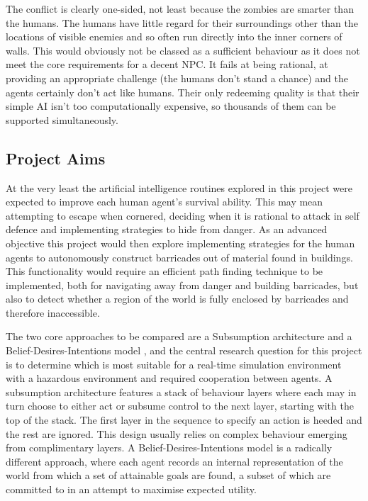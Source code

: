 \documentclass[12pt,a4paper]{article}
\begin{document}
The conflict is clearly one-sided, not least because the zombies are smarter than the humans. The humans have little regard for their surroundings other than the locations of visible enemies and so often run directly into the inner corners of walls. This would obviously not be classed as a sufficient behaviour as it does not meet the core requirements for a decent NPC. It fails at being rational, at providing an appropriate challenge (the humans don't stand a chance) and the agents certainly don't act like humans. Their only redeeming quality is that their simple AI isn't too computationally expensive, so thousands of them can be supported simultaneously.

\subsection{Project Aims}\noindent
At the very least the artificial intelligence routines explored in this project were expected to improve each human agent's survival ability. This may mean attempting to escape when cornered, deciding when it is rational to attack in self defence and implementing strategies to hide from danger. As an advanced objective this project would then explore implementing strategies for the human agents to autonomously construct barricades out of material found in buildings. This functionality would require an efficient path finding technique to be implemented, both for navigating away from danger and building barricades, but also to detect whether a region of the world is fully enclosed by barricades and therefore inaccessible.

The two core approaches to be compared are a Subsumption architecture \cite{brooks90} and a Belief-Desires-Intentions model \cite{rao95}, and the central research question for this project is to determine which is most suitable for a real-time simulation environment with a hazardous environment and required cooperation between agents. A subsumption architecture features a stack of behaviour layers where each may in turn choose to either act or subsume control to the next layer, starting with the top of the stack. The first layer in the sequence to specify an action is heeded and the rest are ignored. This design usually relies on complex behaviour emerging from complimentary layers. A Belief-Desires-Intentions model is a radically different approach, where each agent records an internal representation of the world from which a set of attainable goals are found, a subset of which are committed to in an attempt to maximise expected utility.
\end{document}
